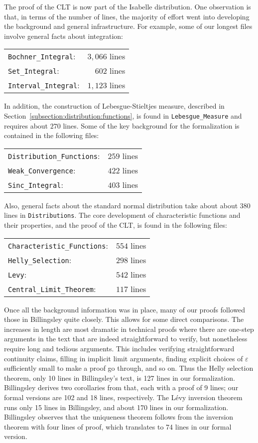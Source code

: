 \documentclass{svjour3}
\begin{document}
The proof of the CLT is now part of the Isabelle distribution. One observation is that, in terms of the number of lines, the majority of effort went into developing the background and general infrastructure. For example, some of our longest files involve general facts about integration:
\begin{center}
\begin{tabular}{lr}
\verb=Bochner_Integral=: & $3,066$ lines \\
\verb=Set_Integral=: & $602$ lines \\
\verb=Interval_Integral=: & $1,123$ lines
\end{tabular}
\end{center}
In addition, the construction of Lebesgue-Stieltjes measure, described in Section~\ref{subsection:distribution:functions}, is found in \verb=Lebesgue_Measure= and requires about $270$ lines. Some of the key background for the formalization is contained in the following files:
\begin{center}
\begin{tabular}{lr}
 \verb=Distribution_Functions=: & $259$ lines \\
 \verb=Weak_Convergence=: & $422$ lines \\
 \verb=Sinc_Integral=: & $403$ lines
\end{tabular}
\end{center}
Also, general facts about the standard normal distribution take about about $380$ lines in \texttt{Distributions}. The core development of characteristic functions and their properties, and the proof of the CLT, is found in the following files:
\begin{center}
\begin{tabular}{lr}
 \verb=Characteristic_Functions=: & $554$ lines \\
 \verb=Helly_Selection=: & $298$ lines \\
 \verb=Levy=: & $542$ lines \\
 \verb=Central_Limit_Theorem=: & $117$ lines
\end{tabular}
\end{center}
Once all the background information was in place, many of our proofs followed those in Billingsley quite closely. This allows for some direct comparisons. The increases in length are most dramatic in technical proofs where there are one-step arguments in the text that are indeed straightforward to verify, but nonetheless require long and tedious arguments. This includes verifying straightforward continuity claims, filling in implicit limit arguments, finding explicit choices of $\varepsilon$ sufficiently small to make a proof go through, and so on. Thus the Helly selection theorem, only 10 lines in Billingsley's text, is 127 lines in our formalization. Billingsley derives two corollaries from that, each with a proof of 9 lines; our formal versions are 102 and 18 lines, respectively. The L\'evy inversion theorem runs only 15 lines in Billingsley, and about 170 lines in our formalization. Billingsley observes that the uniqueness theorem follows from the inversion theorem with four lines of proof, which translates to 74 lines in our formal version.
\end{document}
